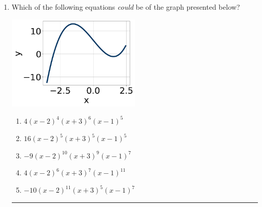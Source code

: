 \documentclass[14pt]{extbook}
\newcommand{\litem}[1]{\item#1\hspace*{-1cm}\rule{\textwidth}{0.4pt}}
\begin{document}
\begin{enumerate}
{\begin{enumerate}[label=\Alph*.]
\end{enumerate} }
\litem{
Which of the following equations \textit{could} be of the graph presented below?
\begin{center}
    \includegraphics[width=0.5\textwidth]{../Figures/polyGraphToFunctionCopyB.png}
\end{center}
\begin{enumerate}[label=\Alph*.]
\item \( 4(x - 2)^{4} (x + 3)^{6} (x - 1)^{5} \)
\item \( 16(x - 2)^{5} (x + 3)^{5} (x - 1)^{5} \)
\item \( -9(x - 2)^{10} (x + 3)^{9} (x - 1)^{7} \)
\item \( 4(x - 2)^{6} (x + 3)^{7} (x - 1)^{11} \)
\item \( -10(x - 2)^{11} (x + 3)^{5} (x - 1)^{7} \)


\end{enumerate}}
\end{enumerate}
\end{document}
